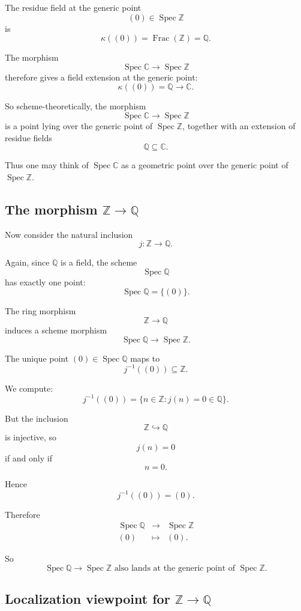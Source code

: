\documentclass[12pt,a4paper]{article}
\DeclareMathOperator{\Spec}{Spec}
\theoremstyle{notespace}
\begin{document}
The residue field at the generic point
\[
(0)\in \Spec\mathbb Z
\]
is
\[
\kappa((0))=\operatorname{Frac}(\mathbb Z)=\mathbb Q.
\]

The morphism
\[
\Spec\mathbb C\to \Spec\mathbb Z
\]
therefore gives a field extension at the generic point:
\[
\kappa((0))=\mathbb Q
\longrightarrow
\mathbb C.
\]

So scheme-theoretically, the morphism
\[
\Spec\mathbb C\to \Spec\mathbb Z
\]
is a point lying over the generic point of \(\Spec\mathbb Z\), together with an extension of residue fields
\[
\mathbb Q\subseteq \mathbb C.
\]

Thus one may think of \(\Spec\mathbb C\) as a geometric point over the generic point of \(\Spec\mathbb Z\).

\subsection{The morphism \texorpdfstring{\(\mathbb Z\to \mathbb Q\)}{Z to Q}}

Now consider the natural inclusion
\[
j:\mathbb Z\longrightarrow \mathbb Q.
\]

Again, since \(\mathbb Q\) is a field, the scheme
\[
\Spec\mathbb Q
\]
has exactly one point:
\[
\Spec\mathbb Q=\{(0)\}.
\]

The ring morphism
\[
\mathbb Z\to \mathbb Q
\]
induces a scheme morphism
\[
\Spec\mathbb Q\longrightarrow \Spec\mathbb Z.
\]

The unique point \((0)\in \Spec\mathbb Q\) maps to
\[
j^{-1}((0))\subseteq \mathbb Z.
\]

We compute:
\[
j^{-1}((0))
=
\{n\in\mathbb Z:j(n)=0\in\mathbb Q\}.
\]

But the inclusion
\[
\mathbb Z\hookrightarrow \mathbb Q
\]
is injective, so
\[
j(n)=0
\]
if and only if
\[
n=0.
\]

Hence
\[
j^{-1}((0))=(0).
\]

Therefore
\[
\begin{array}{ccc}
	\Spec\mathbb Q & \longrightarrow & \Spec\mathbb Z
	\\[6pt]
	(0) & \longmapsto & (0).
\end{array}
\]

So
\[
\boxed{
	\Spec\mathbb Q\to \Spec\mathbb Z
	\text{ also lands at the generic point of }\Spec\mathbb Z.
}
\]

\subsection{Localization viewpoint for \texorpdfstring{\(\mathbb Z\to \mathbb Q\)}{Z to Q}}
\end{document}
